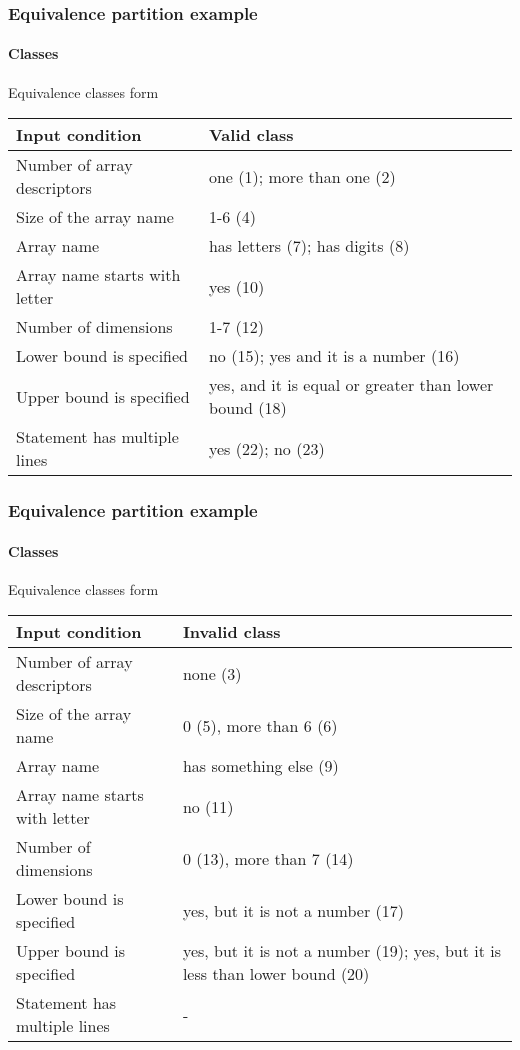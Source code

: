 \begin{frame}[hasprev=true, hasnext=true]
\frametitle{Equivalence partition example}
\framesubtitle{Classes}

\begin{block}{Equivalence classes form}
\begin{tabularx}{\textwidth}{|X|X|}
\textbf{Input condition}		& \textbf{Valid class}\\\hline
Number of array descriptors 	& one (1); more than one (2)\\\hline
Size of the array name			& 1-6 (4)\\\hline
Array name						& has letters (7); has digits (8)\\\hline
Array name starts with letter	& yes (10)\\\hline
Number of dimensions			& 1-7 (12)\\\hline
Lower bound is specified		& no (15); yes and it is a number (16)\\\hline
Upper bound is specified		& yes, and it is equal or greater than lower bound (18)\\\hline
Statement has multiple lines	& yes (22); no (23)\\
\end{tabularx}
\end{block}
\end{frame}




\begin{frame}[hasprev=true, hasnext=true]
\frametitle{Equivalence partition example}
\framesubtitle{Classes}

\begin{block}{Equivalence classes form}
\begin{tabularx}{\textwidth}{|X|X|}
\textbf{Input condition}		& \textbf{Invalid class}\\\hline
Number of array descriptors 	&  none (3) \\\hline
Size of the array name			&  0 (5), more than 6 (6)\\\hline
Array name						&  has something else (9)\\\hline
Array name starts with letter	&  no (11)\\\hline
Number of dimensions			&  0 (13), more than 7 (14)\\\hline
Lower bound is specified		&  yes, but it is not a number (17)\\\hline
Upper bound is specified		&  yes, but it is not a number (19); yes, but it is less than lower bound (20)\\\hline
Statement has multiple lines	&  -\\
\end{tabularx}
\end{block}
\end{frame}




